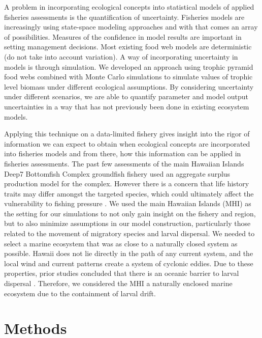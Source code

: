 \documentclass[oneside,12pt,final]{sty/ucthesis-CA2012}
\let\cite\citep                             %
\begin{document}
\begin{mainmatter}
\vspace{5mm}

A problem in incorporating ecological concepts into statistical models of applied fisheries assessments is the quantification of uncertainty. Fisheries models are increasingly using state-space modeling approaches and with that comes an array of possibilities. Measures of the confidence in model results are important in setting management decisions. Most existing food web models are deterministic (do not take into account variation). A way of incorporating uncertainty in models is through simulation. We developed an approach using trophic pyramid food webs combined with Monte Carlo simulations to simulate values of trophic level biomass under different ecological assumptions. By considering uncertainty under different scenarios, we are able to quantify parameter and model output uncertainties in a way that has not previously been done in existing ecosystem models. 

\vspace{5mm}

Applying this technique on a data-limited fishery gives insight into the rigor of information we can expect to obtain when ecological concepts are incorporated into fisheries models and from there, how this information can be applied in fisheries assessments. The past few assessments of the main Hawaiian Islands Deep7 Bottomfish Complex groundfish fishery used an aggregate surplus production model for the complex. However there is a concern that life history traits may differ amongst the targeted species, which could ultimately affect the vulnerability to fishing pressure \cite{brodziak2011stock, langseth2018stock}. We used the main Hawaiian Islands (MHI) as the setting for our simulations to not only gain insight on the fishery and region, but to also minimize assumptions in our model construction, particularly those related to the movement of migratory species and larval dispersal. We needed to select a marine ecosystem that was as close to a naturally closed system as possible. Hawaii does not lie directly in the path of any current system, and the local wind and current patterns create a system of cyclonic eddies. Due to these properties, prior studies concluded that there is an oceanic barrier to larval dispersal \cite{lobel1986transport, vermeij1987dispersal, hourigan1987mid}. Therefore, we considered the MHI a naturally enclosed marine ecosystem due to the containment of larval drift.


\section*{Methods}

\end{mainmatter}
\end{document}
